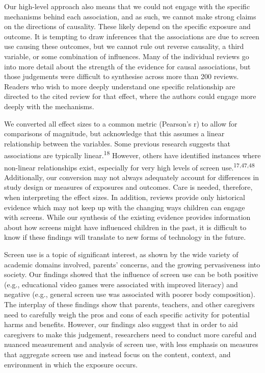 \documentclass[
  english,
  man]{apa6}
\begin{document}
Our high-level approach also means that we could not engage with the specific mechanisms behind each association, and as such, we cannot make strong claims on the directions of causality.
These likely depend on the specific exposure and outcome.
It is tempting to draw inferences that the associations are due to screen use causing these outcomes, but we cannot rule out reverse causality, a third variable, or some combination of influences.
Many of the individual reviews go into more detail about the strength of the evidence for causal associations, but those judgements were difficult to synthesise across more than 200 reviews.
Readers who wish to more deeply understand one specific relationship are directed to the cited review for that effect, where the authors could engage more deeply with the mechanisms.

We converted all effect sizes to a common metric (Pearson's r) to allow for comparisons of magnitude, but acknowledge that this assumes a linear relationship between the variables.
Some previous research suggests that associations are typically linear.\textsuperscript{18}
However, others have identified instances where non-linear relationships exist, especially for very high levels of screen use.\textsuperscript{17,47,48}
Additionally, our conversion may not always adequately account for differences in study design or measures of exposures and outcomes.
Care is needed, therefore, when interpreting the effect sizes.
In addition, reviews provide only historical evidence which may not keep up with the changing ways children can engage with screens.
While our synthesis of the existing evidence provides information about how screens might have influenced children in the past, it is difficult to know if these findings will translate to new forms of technology in the future.

Screen use is a topic of significant interest, as shown by the wide variety of academic domains involved, parents' concerns, and the growing pervasiveness into society.
Our findings showed that the influence of screen use can be both positive (e.g., educational video games were associated with improved literacy) and negative (e.g., general screen use was associated with poorer body composition).
The interplay of these findings show that parents, teachers, and other caregivers need to carefully weigh the pros and cons of each specific activity for potential harms and benefits.
However, our findings also suggest that in order to aid caregivers to make this judgement, researchers need to conduct more careful and nuanced measurement and analysis of screen use, with less emphasis on measures that aggregate screen use and instead focus on the content, context, and environment in which the exposure occurs.
\end{document}
